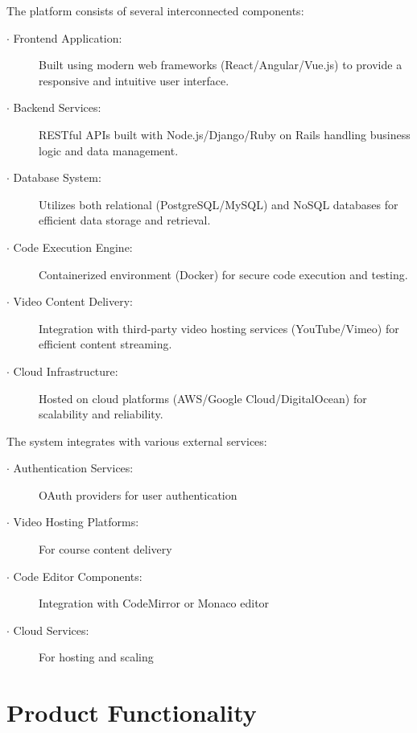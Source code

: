 \documentclass[a4paper, 11pt]{scrreprt}
\begin{document}
The platform consists of several interconnected components:

\begin{description}
    \item[$\cdot$ Frontend Application:] Built using modern web frameworks (React/Angular/Vue.js) to provide a responsive and intuitive user interface.
    \item[$\cdot$ Backend Services:] RESTful APIs built with Node.js/Django/Ruby on Rails handling business logic and data management.
    \item[$\cdot$ Database System:] Utilizes both relational (PostgreSQL/MySQL) and NoSQL databases for efficient data storage and retrieval.
    \item[$\cdot$ Code Execution Engine:] Containerized environment (Docker) for secure code execution and testing.
    \item[$\cdot$ Video Content Delivery:] Integration with third-party video hosting services (YouTube/Vimeo) for efficient content streaming.
    \item[$\cdot$ Cloud Infrastructure:] Hosted on cloud platforms (AWS/Google Cloud/DigitalOcean) for scalability and reliability.
\end{description}

The system integrates with various external services:
\begin{description}
    \item[$\cdot$ Authentication Services:] OAuth providers for user authentication
    \item[$\cdot$ Video Hosting Platforms:] For course content delivery
    \item[$\cdot$ Code Editor Components:] Integration with CodeMirror or Monaco editor
    \item[$\cdot$ Cloud Services:] For hosting and scaling
\end{description}

\section{Product Functionality}
\end{document}
